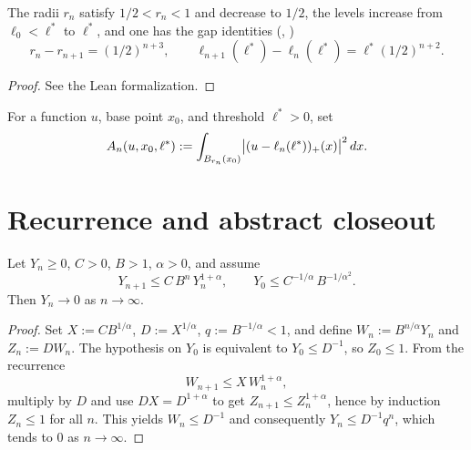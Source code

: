 \begin{lemma}
\label{lem:deGiorgiRadius_gap}
\leanok
{}
The radii $r_n$ satisfy $1/2 < r_n < 1$ and decrease to $1/2$, the
levels increase from $\ell_0 < \ell^*$ to $\ell^*$, and one has
the gap identities (,
)
\begin{equation*}
  r_n - r_{n+1} = (1/2)^{n+3}, \qquad
  \ell_{n+1}(\ell^*) - \ell_n(\ell^*) = \ell^* (1/2)^{n+2}.
\end{equation*}
\end{lemma}

\begin{proof}
\leanok
See the Lean formalization.
\end{proof}

\begin{definition}
\label{def:deGiorgiEnergySeq}
\leanok
{}
For a function $u$, base point $x_0$, and threshold $\ell^* > 0$, set
\begin{equation*}
  A_n(u, x_0, \ell^*) := \int_{B_{r_n}(x_0)}
     \bigl|(u - \ell_n(\ell^*))_+(x)\bigr|^2 \, dx.
\end{equation*}
\end{definition}

\section{Recurrence and abstract closeout}

\begin{theorem}
\label{thm:deGiorgi_recurrence_closeout}
\leanok
Let $Y_n \ge 0$, $C > 0$, $B > 1$, $\alpha > 0$, and assume
\begin{equation*}
  Y_{n+1} \le C\, B^n\, Y_n^{1+\alpha}, \qquad
  Y_0 \le C^{-1/\alpha}\, B^{-1/\alpha^2}.
\end{equation*}
Then $Y_n \to 0$ as $n \to \infty$.
\end{theorem}

\begin{proof}
\leanok

Set $X := C B^{1/\alpha}$, $D := X^{1/\alpha}$, $q :=
B^{-1/\alpha} < 1$, and define $W_n := B^{n/\alpha} Y_n$ and $Z_n :=
D W_n$. The hypothesis on $Y_0$ is equivalent to $Y_0 \le D^{-1}$, so
$Z_0 \le 1$. From the recurrence
\begin{equation*}
  W_{n+1} \le X \, W_n^{1+\alpha},
\end{equation*}
multiply by $D$ and use $D X = D^{1+\alpha}$ to get $Z_{n+1} \le
Z_n^{1+\alpha}$, hence by induction $Z_n \le 1$ for all $n$. This
yields $W_n \le D^{-1}$ and consequently
$Y_n \le D^{-1} q^n$, which tends to $0$ as $n \to \infty$.
\end{proof}

